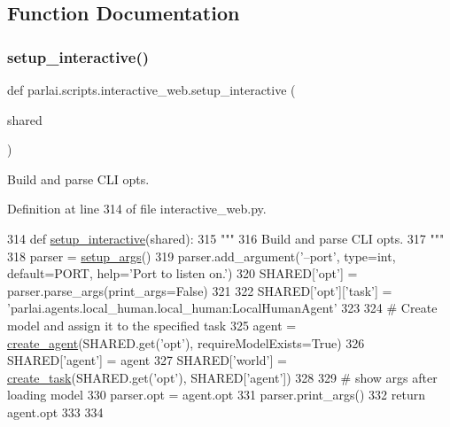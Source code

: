 \subsection{Function Documentation}
\mbox{\label{namespaceparlai_1_1scripts_1_1interactive__web_abeab09cab4f9e60077ffd5050bff36ef}} 
\subsubsection{\texorpdfstring{setup\+\_\+interactive()}{setup\_interactive()}}
{\footnotesize\ttfamily def parlai.\+scripts.\+interactive\+\_\+web.\+setup\+\_\+interactive (\begin{DoxyParamCaption}\item[{}]{shared }\end{DoxyParamCaption})}

\begin{DoxyVerb}Build and parse CLI opts.
\end{DoxyVerb}
 

Definition at line 314 of file interactive\+\_\+web.\+py.


\begin{DoxyCode}
314 \textcolor{keyword}{def }\hyperlink{namespaceparlai_1_1scripts_1_1interactive__web_abeab09cab4f9e60077ffd5050bff36ef}{setup\_interactive}(shared):
315     \textcolor{stringliteral}{"""}
316 \textcolor{stringliteral}{    Build and parse CLI opts.}
317 \textcolor{stringliteral}{    """}
318     parser = \hyperlink{namespaceparlai_1_1chat__service_1_1services_1_1messenger_1_1run_a17bafea2534d593de1fbf1e0724e5b67}{setup\_args}()
319     parser.add\_argument(\textcolor{stringliteral}{'--port'}, type=int, default=PORT, help=\textcolor{stringliteral}{'Port to listen on.'})
320     SHARED[\textcolor{stringliteral}{'opt'}] = parser.parse\_args(print\_args=\textcolor{keyword}{False})
321 
322     SHARED[\textcolor{stringliteral}{'opt'}][\textcolor{stringliteral}{'task'}] = \textcolor{stringliteral}{'parlai.agents.local\_human.local\_human:LocalHumanAgent'}
323 
324     \textcolor{comment}{# Create model and assign it to the specified task}
325     agent = \hyperlink{namespaceparlai_1_1core_1_1agents_ad0d54074d4bcc148bb415ab5515a53b5}{create\_agent}(SHARED.get(\textcolor{stringliteral}{'opt'}), requireModelExists=\textcolor{keyword}{True})
326     SHARED[\textcolor{stringliteral}{'agent'}] = agent
327     SHARED[\textcolor{stringliteral}{'world'}] = \hyperlink{namespaceparlai_1_1core_1_1worlds_a11923c10b545c7ecc1b08fe2242d9c2c}{create\_task}(SHARED.get(\textcolor{stringliteral}{'opt'}), SHARED[\textcolor{stringliteral}{'agent'}])
328 
329     \textcolor{comment}{# show args after loading model}
330     parser.opt = agent.opt
331     parser.print\_args()
332     \textcolor{keywordflow}{return} agent.opt
333 
334 
\end{DoxyCode}


